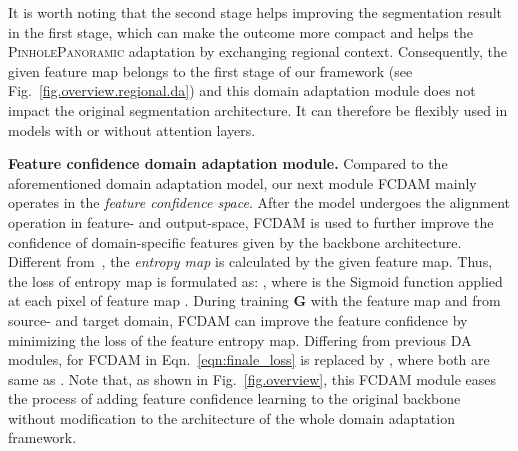 \documentclass[journal]{IEEEtran}
\begin{document}
It is worth noting that the second stage helps improving the segmentation result in the first stage, which can make  the outcome more compact and helps the \textsc{PinholePanoramic} adaptation  by exchanging regional context. 
Consequently, the given feature map belongs to the first stage of our framework (see Fig.~\ref{fig.overview.regional.da}) and this domain adaptation module does not impact the original segmentation architecture. It can therefore be flexibly used in models with or without attention layers.

\textbf{Feature confidence domain adaptation module.}
Compared to the aforementioned domain adaptation model, our next module FCDAM mainly operates in the \emph{feature confidence space}.
After the model undergoes the alignment operation in feature- and output-space, FCDAM is used to further improve the confidence of domain-specific features given by the backbone architecture.
Different from~\cite{advent}, the \emph{entropy map}  is calculated by the given feature map. Thus, the loss of entropy map is formulated as: , where  is the Sigmoid function applied at each pixel of feature map . During training \textbf{G} with the feature map  and  from source- and target domain, FCDAM can improve the feature confidence by minimizing the loss of the feature entropy map. Differing from previous DA modules,  for FCDAM in Eqn.~\eqref{eqn:finale_loss} is replaced by , where both  are same as . Note that, as shown in Fig.~\ref{fig.overview}, this FCDAM module eases the process of adding feature confidence learning to the original backbone without modification to the architecture of the whole domain adaptation framework.

\end{document}
